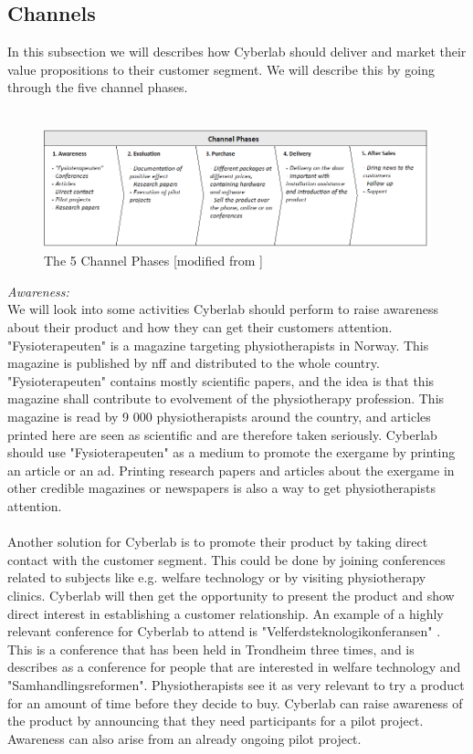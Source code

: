 \subsection{Channels}
In this subsection we will describes how Cyberlab should deliver and market their value propositions to their customer segment. We will describe this by going through the five channel phases.\\ \\
\begin{figure}
\label{fig:Channels}
\begin{center}
\includegraphics[angle=90,scale=0.7]{channels}
\caption[Channels]{The 5 Channel Phases [modified from \cite{osterwalder}\cite{osterwalderthesis}]}
\end{center}
\end{figure}
\emph{Awareness:} \\ 
We will look into some activities Cyberlab should perform to raise awareness about their product and how they can get their customers attention. "Fysioterapeuten" is a magazine targeting physiotherapists in Norway. This magazine is published by \ac{nff} and distributed to the whole country. "Fysioterapeuten" contains mostly scientific papers, and the idea is that this magazine shall contribute to evolvement of the physiotherapy profession. This magazine is read by 9 000 physiotherapists around the country, and articles printed here are seen as scientific and are therefore taken seriously. Cyberlab should use "Fysioterapeuten" as a medium to promote the exergame by printing an article or an ad. Printing research papers and articles about the exergame in other credible magazines or newspapers is also a way to get physiotherapists attention. \\ \\
Another solution for Cyberlab is to promote their product by taking direct contact with the customer segment. This could be done by joining conferences related to subjects like e.g. welfare technology or by visiting physiotherapy clinics. Cyberlab will then get the opportunity to present the product and show direct interest in establishing a customer relationship. An example of a highly relevant conference for Cyberlab to attend is "Velferdsteknologikonferansen" \cite{conference}. This is a conference that has been held in Trondheim three times, and is describes as a conference for people that are interested in welfare technology and "Samhandlingsreformen". Physiotherapists see it as very relevant to try a product for an amount of time before they decide to buy. Cyberlab can raise awareness of the product by announcing that they need participants for a pilot project. Awareness can also arise from an already ongoing pilot project. \\ \\
